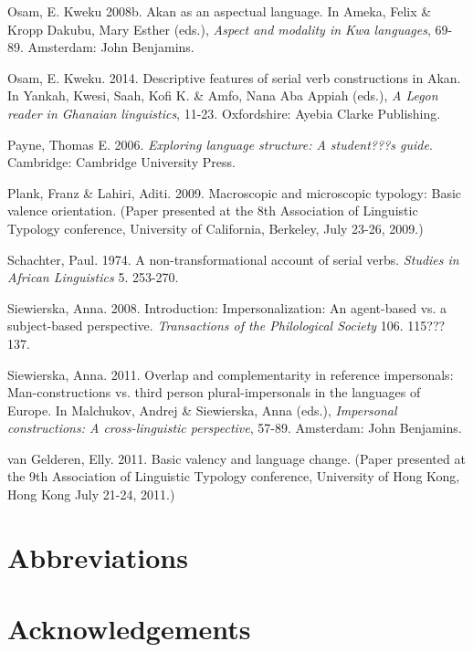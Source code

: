 \documentclass[output=paper]{langsci/langscibook}
\begin{document}
Osam, E. Kweku 2008b. Akan as an aspectual language. In Ameka, Felix \& Kropp Dakubu, Mary Esther (eds.), \textit{Aspect and modality in Kwa languages}, 69-89. Amsterdam: John Benjamins.

Osam, E. Kweku. 2014. Descriptive features of serial verb constructions in Akan. In Yankah, Kwesi, Saah, Kofi K. \& Amfo, Nana Aba Appiah (eds.), \textit{A Legon reader in Ghanaian linguistics}, 11-23. Oxfordshire: Ayebia Clarke Publishing.

Payne, Thomas E. 2006. \textit{Exploring language structure: A student???s guide}. Cambridge: Cambridge University Press.

Plank, Franz \& Lahiri, Aditi. 2009. Macroscopic and microscopic typology: Basic valence orientation. (Paper presented at the 8th Association of Linguistic Typology conference, University of California, Berkeley, July 23-26, 2009.)

Schachter, Paul. 1974. A non-transformational account of serial verbs. \textit{Studies in African Linguistics} 5. 253-270.

Siewierska, Anna. 2008. Introduction: Impersonalization: An agent-based vs. a subject-based perspective. \textit{Transactions of the Philological Society} 106. 115???137.

Siewierska, Anna. 2011. Overlap and complementarity in reference impersonals: Man-constructions vs. third person plural-impersonals in the languages of Europe. In Malchukov, Andrej \& Siewierska, Anna (eds.), \textit{Impersonal constructions: A cross-linguistic perspective}, 57-89. Amsterdam: John Benjamins.

van Gelderen, Elly. 2011. Basic valency and language change. (Paper presented at the 9th Association of Linguistic Typology conference, University of Hong Kong, Hong Kong July 21-24, 2011.)


\section*{Abbreviations}
\section*{Acknowledgements}

{\sloppy
\printbibliography[heading=subbibliography,notkeyword=this]
}
\end{document}
